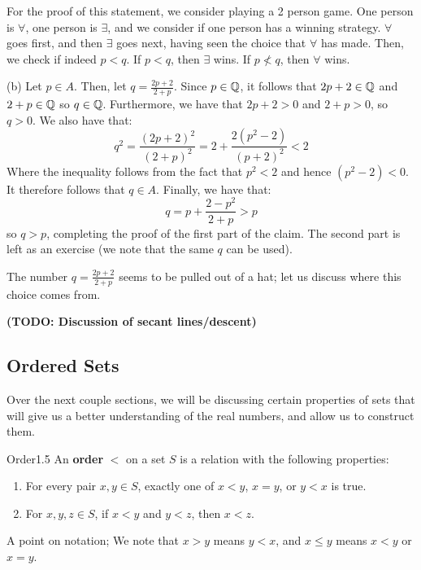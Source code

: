 For the proof of this statement, we consider playing a 2 person game. One person is $\forall$, one person is $\exists$, and we consider if one person has a winning strategy. $\forall$ goes first, and then $\exists$ goes next, having seen the choice that $\forall$ has made. Then, we check if indeed $p < q$. If $p < q$, then $\exists$ wins. If $p \not< q$, then $\forall$ wins. 

\begin{nproof}
    (b) Let $p \in A$. Then, let $q = \frac{2p + 2}{2 + p}$. Since $p \in \mathbb{Q}$, it follows that $2p + 2 \in \mathbb{Q}$ and $2 + p \in \mathbb{Q}$ so $q \in \mathbb{Q}$. Furthermore, we have that $2p + 2 > 0$ and $2 + p > 0$, so $q > 0$. We also have that:
    \[q^2 = \frac{(2p+2)^2}{(2+p)^2} = 2 + \frac{2(p^2 - 2)}{(p+2)^2} < 2\]
    Where the inequality follows from the fact that $p^2 < 2$ and hence $(p^2 - 2) < 0$. It therefore follows that $q \in A$. Finally, we have that:
    \[q = p + \frac{2-p^2}{2+p} > p\]
    so $q > p$, completing the proof of the first part of the claim. The second part is left as an exercise (we note that the same $q$ can be used).
\end{nproof}

The number $q = \frac{2p+ 2}{2 + p}$ seems to be pulled out of a hat; let us discuss where this choice comes from.

\textbf{(TODO: Discussion of secant lines/descent)}

\subsection{Ordered Sets}
Over the next couple sections, we will be discussing certain properties of sets that will give us a better understanding of the real numbers, and allow us to construct them.

\setcounter{rudin}{4}

\begin{definition}{Order}{1.5}
    An \textbf{order} $<$ on a set $S$ is a relation with the following properties:
    \begin{enumerate}
        \item For every pair $x, y \in S$, exactly one of $x < y$, $x = y$, or $y < x$ is true. 
        \item For $x, y, z \in S$, if $x < y$ and $y < z$, then $x < z$. 
    \end{enumerate}
    A point on notation; We note that $x > y$ means $y < x$, and $x \leq y$ means $x < y$ or $x = y$. 
\end{definition}

